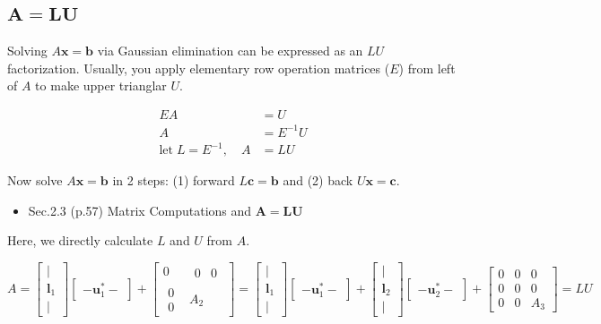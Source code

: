 \documentclass[letterpaper]{article}
\begin{document}
\subsection{$\boldsymbol{A=LU}$}

Solving $A\bm{x}=\bm{b}$  via Gaussian elimination can be expressed as an $LU$ factorization.
Usually, you apply elementary row operation matrices ($E$) from left of $A$ to make upper trianglar $U$.

\begin{align*}
  EA &= U\\
  A &= E^{-1}U\\
\text{let} \; L = E^{-1}, \quad  A &= LU
\end{align*}

Now solve $A\bm{x}=\bm{b}$ in 2 steps: (1) forward $L\bm{c}=\bm{b}$ and (2) back $U\bm{x}=\bm{c}$.


\begin{itemize}
  \item Sec.2.3 (p.57) Matrix Computations and $\bm{A=LU}$
\end{itemize}

Here, we directly calculate $L$ and $U$ from $A$.

\begin{equation*}
  A = 
      \begin{bmatrix}
        |\\
        \bm{l}_1\\
        |
      \end{bmatrix}
      \begin{bmatrix}
        -  \bm{u}^*_1  -
      \end{bmatrix}
  +  \begin{bmatrix}
      0 & \begin{matrix} 0 & 0 \end{matrix}\\
      \begin{matrix} 0 \\ 0 \end{matrix} & A_2
    \end{bmatrix}
  = 
  \begin{bmatrix}
    |\\
    \bm{l}_1\\
    |
  \end{bmatrix}
  \begin{bmatrix}
    - \bm{u}^*_1 -
  \end{bmatrix}
  +
  \begin{bmatrix}
    |\\
    \bm{l}_2\\
    |
  \end{bmatrix}
  \begin{bmatrix}
    - \bm{u}^*_2  -
  \end{bmatrix}
  +  \begin{bmatrix}
  0 & 0 & 0\\
  0 & 0 & 0 \\
  0 & 0 & A_3
  \end{bmatrix} = LU
\end{equation*}
 
\end{document}
